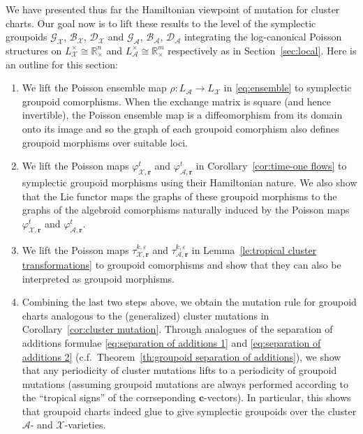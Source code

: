 \documentclass{amsart}
\numberwithin{equation}{section}
\newcommand{\bfc}{\mathbf{c}}
\newcommand{\bfr}{{\boldsymbol{r}}}
\newcommand{\cA}{\mathcal{A}}
\newcommand{\cB}{\mathcal{B}}
\newcommand{\cD}{\mathcal{D}}
\newcommand{\cG}{\mathcal{G}}
\newcommand{\cX}{\mathcal{X}}
\newcommand{\RR}{\mathbb{R}}
\begin{document}
We have presented thus far the Hamiltonian viewpoint of mutation for cluster charts.
Our goal now is to lift these results to the level of the symplectic groupoids $\cG_\cX$, $\cB_\cX$, $\cD_\cX$ and $\cG_\cA$, $\cB_\cA$, $\cD_\cA$ integrating the log-canonical Poisson structures on $L^\times_\cX\cong\RR_\times^n$ and $L^\times_\cA\cong\RR_\times^m$ respectively as in Section~\ref{sec:local}.
Here is an outline for this section:
\begin{enumerate}
  \item We lift the Poisson ensemble map $\rho:L_\cA\to L_\cX$ in \eqref{eq:ensemble} to symplectic groupoid comorphisms.
    When the exchange matrix is square (and hence invertible), the Poisson ensemble map is a diffeomorphism from its domain onto its image and so the graph of each groupoid comorphism also defines groupoid morphisms over suitable loci.
  \item We lift the Poisson maps $\varphi_{\cX,\bfr}^t$ and $\varphi_{\cA,\bfr}^t$ in Corollary~\ref{cor:time-one flows} to symplectic groupoid morphisms using their Hamiltonian nature.
    We also show that the Lie functor maps the graphs of these groupoid morphisms to the graphs of the algebroid comorphisms naturally induced by the Poisson maps $\varphi_{\cX,\bfr}^t$ and $\varphi_{\cA,\bfr}^t$.
  \item We lift the Poisson maps $\tau_{\cX,\bfr}^{k,\varepsilon}$ and $\tau_{\cA,\bfr}^{k,\varepsilon}$ in Lemma~\ref{le:tropical cluster transformations} to groupoid comorphisms and show that they can also be interpreted as groupoid morphisms.
  \item Combining the last two steps above, we obtain the mutation rule for groupoid charts analogous to the (generalized) cluster mutations in Corollary~\ref{cor:cluster mutation}.
    Through analogues of the separation of additions formulae \eqref{eq:separation of additions 1} and \eqref{eq:separation of additions 2} (c.f.\ Theorem~\ref{th:groupoid separation of additions}), we show that any periodicity of cluster mutations lifts to a periodicity of groupoid mutations (assuming groupoid mutations are always performed according to the ``tropical signs'' of the corrseponding $\bfc$-vectors).
    In particular, this shows that groupoid charts indeed glue to give symplectic groupoids over the cluster $\cA$- and $\cX$-varieties.
\end{enumerate}
\end{document}

